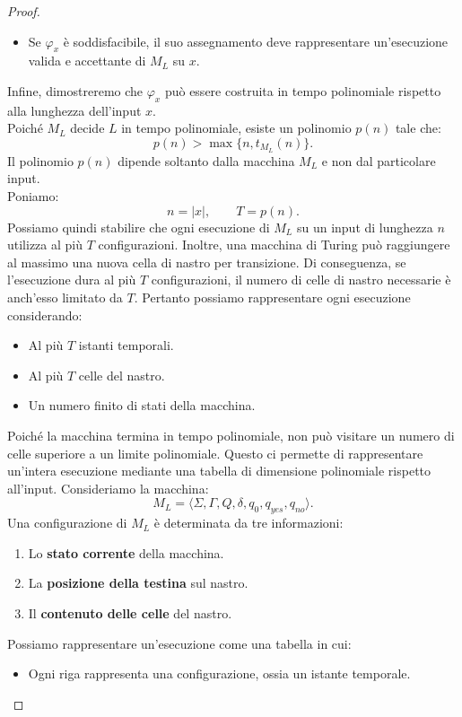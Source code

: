 \begin{proof}
\begin{itemize}
    \item Se $\varphi_x$ è soddisfacibile, il suo
    assegnamento deve rappresentare un'esecuzione
    valida e accettante di $M_L$ su $x$.
\end{itemize}
Infine, dimostreremo che $\varphi_x$ può essere
costruita in tempo polinomiale rispetto alla
lunghezza dell'input $x$.\\
Poiché $M_L$ decide $L$ in tempo polinomiale,
esiste un polinomio $p(n)$ tale che:
\[
p(n)>\max\{n,t_{M_L}(n)\}.
\]
Il polinomio $p(n)$ dipende soltanto dalla macchina
$M_L$ e non dal particolare input.\\
Poniamo:
\[
n=|x|,\qquad T=p(n).
\]
Possiamo quindi stabilire che ogni esecuzione di
$M_L$ su un input di lunghezza $n$ utilizza
al più $T$ configurazioni.
Inoltre, una macchina di Turing può raggiungere
al massimo una nuova cella di nastro per transizione.
Di conseguenza, se l'esecuzione dura al più $T$
configurazioni, il numero di celle di nastro
necessarie è anch'esso limitato da $T$.
Pertanto possiamo rappresentare ogni esecuzione
considerando:
\begin{itemize}
    \item Al più $T$ istanti temporali.
    \item Al più $T$ celle del nastro.
    \item Un numero finito di stati della macchina.
\end{itemize}
Poiché la macchina termina in tempo polinomiale,
non può visitare un numero di celle superiore
a un limite polinomiale.
Questo ci permette di rappresentare un'intera
esecuzione mediante una tabella di dimensione
polinomiale rispetto all'input.
Consideriamo la macchina:
\[
M_L=
\langle
\Sigma,\Gamma,Q,\delta,q_0,q_{yes},q_{no}
\rangle.
\]
Una configurazione di $M_L$ è determinata da
tre informazioni:
\begin{enumerate}
    \item Lo \textbf{stato corrente} della macchina.
    \item La \textbf{posizione della testina} sul nastro.
    \item Il \textbf{contenuto delle celle} del nastro.
\end{enumerate}
Possiamo rappresentare un'esecuzione come una tabella in cui:
\begin{itemize}
    \item Ogni riga rappresenta una configurazione,
    ossia un istante temporale.


\end{itemize}
\end{proof}
